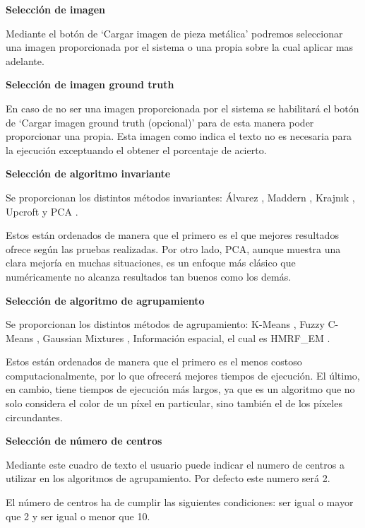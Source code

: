 \textbf{Selección de imagen}\label{selección-de-imagen}

Mediante el botón de `Cargar imagen de pieza metálica' podremos seleccionar una imagen proporcionada por el sistema o una propia sobre la cual aplicar mas adelante.

\textbf{Selección de imagen ground truth}\label{selección-de-imagen-ground-truth}

En caso de no ser una imagen proporcionada por el sistema se habilitará el botón de `Cargar imagen ground truth (opcional)' para de esta manera poder proporcionar una propia. Esta imagen como indica el texto no es necesaria para la ejecución exceptuando el obtener el porcentaje de acierto.

\textbf{Selección de algoritmo invariante}\label{selección-de-algoritmo-invariante}

Se proporcionan los distintos métodos invariantes: Álvarez \cite{alvarez2011}, Maddern \cite{maddern2014}, Krajnık \cite{krajník2015}, Upcroft \cite{upcroft2014} y PCA \cite{pca2017}.

Estos están ordenados de manera que el primero es el que mejores resultados ofrece según las pruebas realizadas. Por otro lado, PCA, aunque muestra una clara mejoría en muchas situaciones, es un enfoque más clásico que numéricamente no alcanza resultados tan buenos como los demás.

\textbf{Selección de algoritmo de agrupamiento}\label{selección-de-algoritmo-de-agrupamiento}

Se proporcionan los distintos métodos de agrupamiento: K-Means \cite{MATLAB:2023bKmeans}, Fuzzy C-Means \cite{MATLAB:2023bFuzzy}, Gaussian Mixtures \cite{MATLAB:2023bGMM}, Información espacial, el cual es HMRF\_EM \cite{wang2012hmrf}.

Estos están ordenados de manera que el primero es el menos costoso computacionalmente, por lo que ofrecerá mejores tiempos de ejecución. El último, en cambio, tiene tiempos de ejecución más largos, ya que es un algoritmo que no solo considera el color de un píxel en particular, sino también el de los píxeles circundantes.

\textbf{Selección de número de centros}\label{selección-de-número-de-centros}

Mediante este cuadro de texto el usuario puede indicar el numero de centros a utilizar en los algoritmos de agrupamiento. Por defecto este numero será 2.

El número de centros ha de cumplir las siguientes condiciones: ser igual o mayor que 2 y ser igual o menor que 10.

